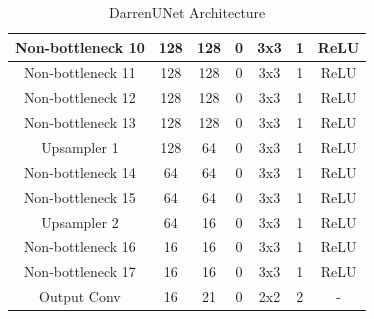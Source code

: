 \begin{table}[htbp]
\begin{tabular}{|c|c|c|c|c|c|c|}
		Non-bottleneck 10 & 128         & 128          & 0                & 3x3             & 1               & ReLU                \\ \hline
		Non-bottleneck 11 & 128         & 128          & 0                & 3x3             & 1               & ReLU                \\ \hline
		Non-bottleneck 12 & 128         & 128          & 0                & 3x3             & 1               & ReLU                \\ \hline
		Non-bottleneck 13 & 128         & 128          & 0                & 3x3             & 1               & ReLU                \\ \hline
		Upsampler 1       & 128         & 64           & 0                & 3x3             & 1               & ReLU                \\ \hline
		Non-bottleneck 14 & 64          & 64           & 0                & 3x3             & 1               & ReLU                \\ \hline
		Non-bottleneck 15 & 64          & 64           & 0                & 3x3             & 1               & ReLU                \\ \hline
		Upsampler 2       & 64          & 16           & 0                & 3x3             & 1               & ReLU                \\ \hline
		Non-bottleneck 16 & 16          & 16           & 0                & 3x3             & 1               & ReLU                \\ \hline
		Non-bottleneck 17 & 16          & 16           & 0                & 3x3             & 1               & ReLU                \\ \hline
		Output Conv       & 16          & 21           & 0                & 2x2             & 2               & -                   \\ \hline
	\end{tabular}
	\caption{DarrenUNet Architecture}
\end{table}

